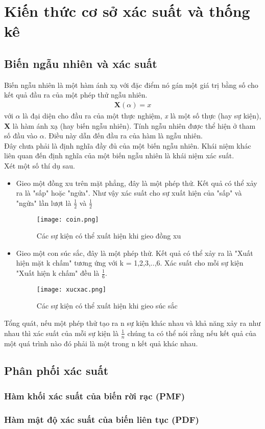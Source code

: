 \chapter{Kiến thức cơ sở xác suất và thống kê}\label{ch:1}
\section{Biến ngẫu nhiên và xác suất}\label{sec:1.1}
Biến ngẫu nhiên là một hàm ánh xạ với đặc điểm nó gán một giá trị bằng số cho kết quả đầu ra của một phép thử ngẫu nhiên.
\begin{align}
    \textbf{X}(\alpha)=\textit{x}
\end{align}
với $\alpha$ là đại diện cho đầu ra của một thực nghiệm, \textit{x} là một số thực (hay sự kiện), \textbf{X} là hàm ánh xạ (hay biến ngẫu nhiên).  
Tính ngẫu nhiên được thể hiện ở tham số đầu vào $\alpha$. Điều này dẫn đến đầu ra của hàm là ngẫu nhiên.\\
Đây chưa phải là định nghĩa đầy đủ của một biến ngẫu nhiên. Khái niệm khác liên quan đến định nghĩa của một biến ngẫu nhiên là khái niệm xác suất. \\
Xét một số thí dụ sau.
\begin{itemize}
    \item Gieo một đồng xu trên mặt phẳng, đây là một phép thử. Kết quả có thể xảy ra là "sấp" hoặc "ngửa". Như vậy xác suất cho sự xuất hiện của "sấp" và "ngửa" lần lượt là 
	$ \frac{1}{2} $ và $ \frac{1}{2} $
	\begin{figure}[H]
		\centering
		\texttt{[image: coin.png]}
		\caption{Các sự kiện có thể xuất hiện khi gieo đồng xu}
		\label{fig:web}
	   \end{figure}
    \item Gieo một con súc sắc, đây là một phép thử. Kết quả có thể xảy ra là "Xuất hiện mặt k chấm" tương ứng với k = 1,2,3,..,6. Xác suất cho mỗi sự kiện "Xuất hiện k chấm" đều là $ \frac{1}{6} $.
    \begin{figure}[H]
		\centering
		\texttt{[image: xucxac.png]}
		\caption{Các sự kiện có thể xuất hiện khi gieo súc sắc}
		\label{fig:web}
	   \end{figure}
\end{itemize}
Tổng quát, nếu một phép thử tạo ra n sự kiện khác nhau và khả năng xảy ra như nhau thì xác suất của mỗi sự kiện là $ \frac{1}{n} $
chúng ta có thể nói rằng nếu kết quả của một quá trình nào đó phải là một trong n kết quả khác nhau. 
\par
\section{Phân phối xác suất}\label{sec:1.2}
\par
\subsection{Hàm khối xác suất của biến rời rạc (PMF)}\label{subsec:1.2.1}
\par
\subsection{Hàm mật độ xác suất của biến liên tục (PDF)}\label{subsec:1.2.2}


